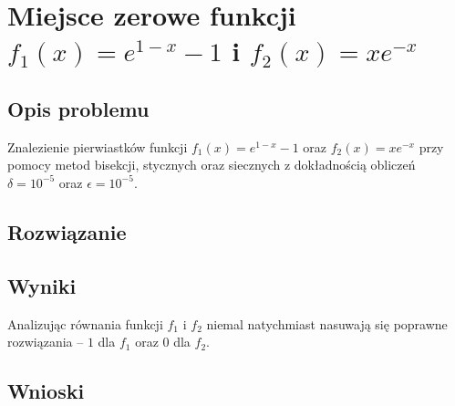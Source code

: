 \documentclass[11pt]{mk-polish-lab-report}
\begin{document}
\section{Miejsce zerowe funkcji $f_1(x) = e^{1-x} - 1$ i $f_2(x) = xe^{-x}$}

\subsection{Opis problemu}
Znalezienie pierwiastków funkcji $f_1(x)=e^{1-x}-1$ oraz $f_2(x)=xe^{-x}$ przy pomocy metod bisekcji, stycznych oraz siecznych z dokładnością obliczeń $\delta=10^{-5}$ oraz $\epsilon=10^{-5}$.

\subsection{Rozwiązanie}

\subsection{Wyniki}
Analizując równania funkcji $f_1$ i $f_2$ niemal natychmiast nasuwają się poprawne rozwiązania -- $1$ dla $f_1$ oraz $0$ dla $f_2$.

\subsection{Wnioski}

%
\end{document}
